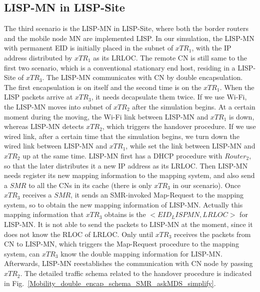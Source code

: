 {%
\subsection{LISP-MN in LISP-Site}
\label{sec:ns3_analysis_lispmn_xTR}
The third scenario is the LISP-MN in LISP-Site, where both the border routers and the mobile node MN are implemented LISP. In our simulation, the LISP-MN with permanent EID is initially placed in the subnet of $xTR_1$, with the IP address distributed by $xTR_1$ as its LRLOC. The remote CN is still same to the first two scenario, which is a conventional stationary end host, residing in a LISP-Site of $xTR_3$. The LISP-MN communicates with CN by double encapsulation. The first encapsulation is on itself and the second time is on the $xTR_1$. When the LISP packets arrive at $xTR_3$, it needs decapsulate them twice. If we use Wi-Fi, the LISP-MN moves into subnet of $xTR_2$ after the simulation begins. At a certain moment during the moving, the Wi-Fi link between LISP-MN and $xTR_1$ is down, whereas LISP-MN detects $xTR_2$, which triggers the handover procedure. If we use wired link, after a certain time that the simulation begins, we turn down the wired link between LISP-MN and $xTR_1$, while set the link between LISP-MN and $xTR_2$ up at the same time. LISP-MN first has a DHCP procedure with $Router_2$, so that the later distributes it a new IP address as its LRLOC. Then LISP-MN needs register its new mapping information to the mapping system, and also send a $SMR$ to all the CNs in its cache (there is only $xTR_3$ in our scenario). Once $xTR_3$ receives a $SMR$, it sends an SMR-invoked Map-Request to the mapping system, so to obtain the new mapping information of LISP-MN. Actually this mapping information that $xTR_3$ obtains is the $<EID_LISPMN, LRLOC>$ for LISP-MN. It is not able to send the packets to LISP-MN at the moment, since it does not know the RLOC of LRLOC. Only until $xTR_3$ receives the packets from CN to LISP-MN, which triggers the Map-Request procedure to the mapping system, can $xTR_3$ know the double mapping information for LISP-MN. Afterwards, LISP-MN reestablishes the communication with CN node by passing $xTR_2$. The detailed traffic schema related to the handover procedure is indicated in Fig.~\ref{Mobility_double_encap_schema_SMR_askMDS_simplify}.
\begin{figure}[!th]
	\centering

\end{figure}}
